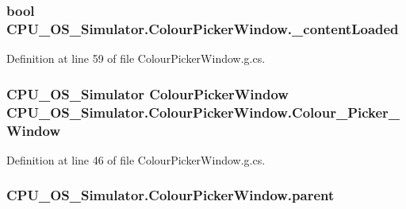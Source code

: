 \subsubsection[{\+\_\+content\+Loaded}]{\setlength{\rightskip}{0pt plus 5cm}bool C\+P\+U\+\_\+\+O\+S\+\_\+\+Simulator.\+Colour\+Picker\+Window.\+\_\+content\+Loaded\hspace{0.3cm}{\ttfamily [private]}}\label{class_c_p_u___o_s___simulator_1_1_colour_picker_window_aeb35df31199f12fcf32b741db20a1546}


Definition at line 59 of file Colour\+Picker\+Window.\+g.\+cs.

\hypertarget{class_c_p_u___o_s___simulator_1_1_colour_picker_window_ae1fb4e0b93aecac6fdff7fe54382e033}{}
\subsubsection[{Colour\+\_\+\+Picker\+\_\+\+Window}]{\setlength{\rightskip}{0pt plus 5cm}C\+P\+U\+\_\+\+O\+S\+\_\+\+Simulator {\bf Colour\+Picker\+Window} C\+P\+U\+\_\+\+O\+S\+\_\+\+Simulator.\+Colour\+Picker\+Window.\+Colour\+\_\+\+Picker\+\_\+\+Window\hspace{0.3cm}{\ttfamily [package]}}\label{class_c_p_u___o_s___simulator_1_1_colour_picker_window_ae1fb4e0b93aecac6fdff7fe54382e033}


Definition at line 46 of file Colour\+Picker\+Window.\+g.\+cs.

\hypertarget{class_c_p_u___o_s___simulator_1_1_colour_picker_window_a0a40b478316b3e45a63c67347ff9fc63}{}
\subsubsection[{parent}]{ C\+P\+U\+\_\+\+O\+S\+\_\+\+Simulator.\+Colour\+Picker\+Window.\+parent\hspace{0.3cm}{\ttfamily [private]}}\label{class_c_p_u___o_s___simulator_1_1_colour_picker_window_a0a40b478316b3e45a63c67347ff9fc63}


